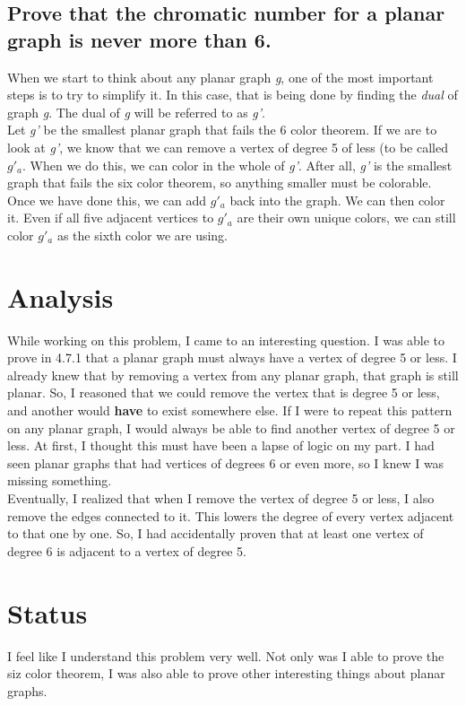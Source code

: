 \documentclass[11pt]{article} %
\begin{document}
\subsection*{Prove that the chromatic number for a planar graph is never more than 6.}
When we start to think about any planar graph \textit{g}, one of the most important steps is to try to simplify it. 
In this case, that is being done by finding the \textit{dual} of graph \textit{g}.
The dual of \textit{g} will be referred to as \textit{g'}.
\\
Let \textit{g'} be the smallest planar graph that fails the 6 color theorem. 
If we are to look at \textit{g'}, we know that we can remove a vertex of degree 5 of less (to be called \textit{$g'_a$}. 
When we do this, we can color in the whole of \textit{g'}. 
After all, \textit{g'} is the smallest graph that fails the six color theorem, so anything smaller must be colorable. 
Once we have done this, we can add \textit{$g'_a$} back into the graph. 
We can then color it. Even if all five adjacent vertices to \textit{$g'_a$} are their own unique colors, we can still color \textit{$g'_a$} as the sixth color we are using. 


\section{Analysis}
While working on this problem, I came to an interesting question. I was able to prove in 4.7.1 that a planar graph must always have a vertex of degree 5 or less. 
I already knew that by removing a vertex from any planar graph, that graph is still planar. 
So, I reasoned that we could remove the vertex that is degree 5 or less, and another would \textbf{have} to exist somewhere else.
If I were to repeat this pattern on any planar graph, I would always be able to find another vertex of degree 5 or less. At first, I thought this must have been a lapse of logic on my part. 
I had seen planar graphs that had vertices of degrees 6 or even more, so I knew I was missing something. 
\\
Eventually, I realized that when I remove the vertex of degree 5 or less, I also remove the edges connected to it. This lowers the degree of every vertex adjacent to that one by one. 
So, I had accidentally proven that at least one vertex of degree 6 is adjacent to a vertex of degree 5. 

\section{Status}
I feel like I understand this problem very well. Not only was I able to prove the siz color theorem, I was also able to prove other interesting things about planar graphs.
\end{document}
